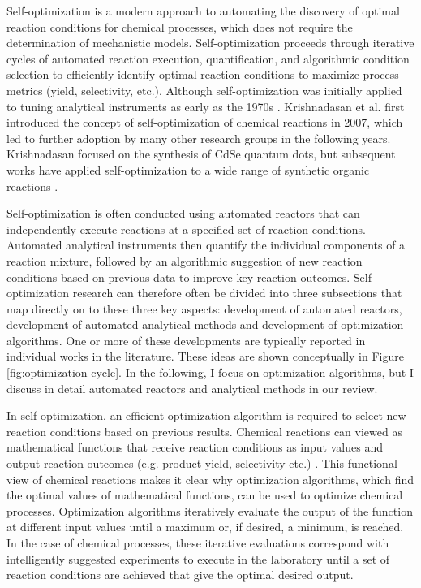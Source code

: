 Self-optimization is a modern approach to automating the discovery of optimal reaction conditions for chemical processes, which does not require the determination of mechanistic models. Self-optimization proceeds through iterative cycles of automated reaction execution, quantification, and algorithmic condition selection to efficiently identify optimal reaction conditions to maximize process metrics (yield, selectivity, etc.). Although self-optimization was initially applied to tuning analytical instruments as early as the 1970s \cite{Routh1977}. Krishnadasan et al. \cite{Krishnadasan2007} first introduced the concept of self-optimization of chemical reactions in 2007, which led to further adoption by many other research groups in the following years. Krishnadasan focused on the synthesis of CdSe quantum dots, but subsequent works have applied self-optimization to a wide range of synthetic organic reactions \cite{McMullen2010a, McMullen2011, Bourne2011, Moore2012, christensen2021, Reizman2016b, Fitzpatrick2016,Echtermeyer2017}.

Self-optimization is often conducted using automated reactors that can independently execute reactions at a specified set of reaction conditions. Automated analytical instruments then quantify the individual components of a reaction mixture, followed by an algorithmic suggestion of new reaction conditions based on previous data to improve key reaction outcomes. Self-optimization research can therefore often be divided into three subsections that map directly on to these three key aspects: development of automated reactors, development of automated analytical methods and development of optimization algorithms. One or more of these developments are typically reported in individual works in the literature. These ideas are shown conceptually in Figure \ref{fig:optimization-cycle}.  In the following, I focus on optimization algorithms, but I discuss in detail automated reactors and analytical methods in our review.

In self-optimization, an efficient optimization algorithm is required to select new reaction conditions based on previous results. Chemical reactions can viewed as mathematical functions that receive reaction conditions as input values and output reaction outcomes (e.g. product yield, selectivity etc.) \cite{Clayton2019}. This functional view of chemical reactions makes it clear why optimization algorithms, which find the optimal values of mathematical functions, can be used to optimize chemical processes. Optimization algorithms iteratively evaluate the output of the function at different input values until a maximum or, if desired, a minimum, is reached. In the case of chemical processes, these iterative evaluations correspond with intelligently suggested experiments to execute in the laboratory until a set of reaction conditions are achieved that give the optimal desired output.

